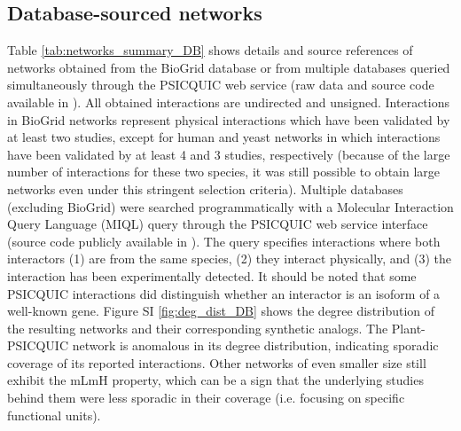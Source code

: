 

\newpage
\subsection{Database-sourced networks}\label{sup_realnets_DB}
Table \ref{tab:networks_summary_DB} shows details and source references of networks obtained from the  BioGrid database or from multiple databases queried simultaneously through the PSICQUIC web service (raw data and source code available in  \cite{atiia_case-study_2017}).
All obtained interactions are undirected and unsigned. Interactions in BioGrid networks represent physical interactions which have been validated by at least two studies, except for human and yeast networks in which interactions have been validated by at least 4 and 3 studies, respectively (because of the large number of interactions for these two species, it was still possible to obtain large networks even under this stringent selection criteria). Multiple databases  (excluding BioGrid) were searched programmatically with a Molecular Interaction Query Language (MIQL) query through the  PSICQUIC web service interface (source code publicly available in  \cite{atiia_case-study_2017}).
The query specifies interactions where both interactors (1) are from the same species,  (2) they interact physically, and (3) the interaction has been experimentally detected.
It should be noted that some PSICQUIC interactions did distinguish whether an interactor is an isoform of a well-known gene. Figure SI \ref{fig:deg_dist_DB} shows the degree distribution of the resulting networks and their corresponding synthetic analogs. The Plant-PSICQUIC network is anomalous in its degree distribution, indicating sporadic coverage of its reported interactions. Other networks of even smaller size still exhibit the mLmH property, which can be a sign that the underlying studies behind them were less sporadic in their coverage (i.e. focusing on specific functional units).


\newpage

